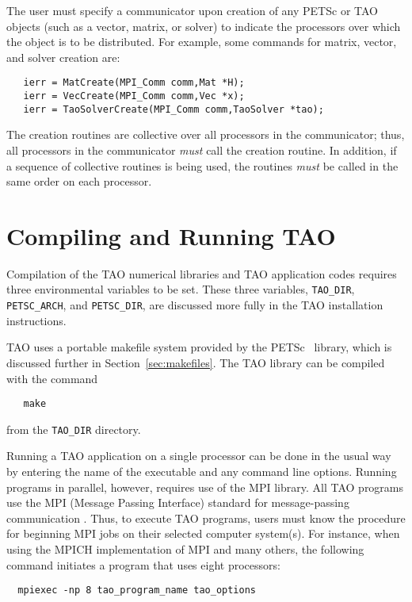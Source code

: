 The user must specify a communicator
upon creation of any PETSc or TAO objects (such as a vector, matrix, or solver)
to indicate the processors over which the object is to be distributed.
For example, some commands for matrix, vector, and solver creation
are:
\begin{verbatim}
   ierr = MatCreate(MPI_Comm comm,Mat *H);
   ierr = VecCreate(MPI_Comm comm,Vec *x);
   ierr = TaoSolverCreate(MPI_Comm comm,TaoSolver *tao); 
\end{verbatim}
\noindent
The creation routines are collective over all processors in the
communicator; thus, all processors in the communicator {\em must} call
the creation routine.  In addition, if a sequence of collective
routines is being used, the routines {\em must} be called in the same
order on each processor.

\section{Compiling and Running TAO}
\label{sec:running}

Compilation of the TAO numerical libraries and TAO application codes
requires three environmental variables to be set.  These three
variables, \texttt{TAO\_DIR}, \texttt{PETSC\_ARCH}, and \texttt{PETSC\_DIR},
are discussed more fully in the TAO installation instructions.

TAO uses a portable makefile system provided by the
PETSc~\cite{petsc-web-page,petsc-user-ref} library, which is discussed
further in Section~\ref{sec:makefiles}.  The TAO library can be
compiled with the command
\begin{verbatim}
   make
\end{verbatim}
\noindent
from the \texttt{TAO\_DIR} directory.  

Running a TAO application on a single processor can be done in the
usual way by entering the name of the executable and any command line
options.  Running programs in parallel, however, requires use of the
MPI library.  All TAO programs use the MPI (Message Passing Interface)
standard for message-passing communication \cite{MPI-final}.  Thus, to
execute TAO programs, users must know the procedure for beginning MPI
jobs on their selected computer system(s).  For instance, when using
the MPICH implementation of MPI \cite{mpich-web-page} and many others,
the following command initiates a program that uses eight processors:
\begin{verbatim}
  mpiexec -np 8 tao_program_name tao_options
\end{verbatim}

